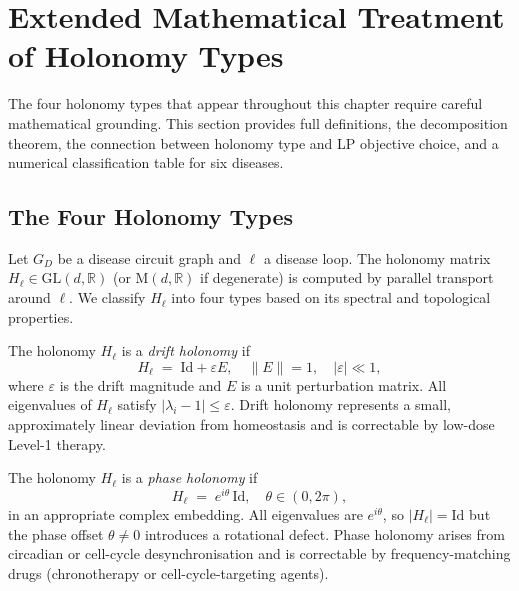 \section{Extended Mathematical Treatment of Holonomy Types}
\label{sec:ch10-holonomy-types}

The four holonomy types that appear throughout this chapter require careful
mathematical grounding.  This section provides full definitions, the
decomposition theorem, the connection between holonomy type and LP objective
choice, and a numerical classification table for six diseases.

\subsection{The Four Holonomy Types}

Let $G_D$ be a disease circuit graph and $\ell$ a disease loop.  The holonomy
matrix $H_\ell \in \mathrm{GL}(d, \mathbb{R})$ (or $\mathrm{M}(d,\mathbb{R})$
if degenerate) is computed by parallel transport around $\ell$.  We classify
$H_\ell$ into four types based on its spectral and topological properties.

\begin{definition}
\label{def:ch10-drift-holonomy}
The holonomy $H_\ell$ is a \emph{drift holonomy} if
\begin{equation}
  H_\ell \;=\; \mathrm{Id} + \varepsilon E,
  \quad \|E\| = 1,\quad |\varepsilon| \ll 1,
\end{equation}
where $\varepsilon$ is the drift magnitude and $E$ is a unit perturbation matrix.
All eigenvalues of $H_\ell$ satisfy $|\lambda_i - 1| \leq \varepsilon$.
Drift holonomy represents a small, approximately linear deviation from
homeostasis and is correctable by low-dose Level-1 therapy.
\end{definition}

\begin{definition}
\label{def:ch10-phase-holonomy}
The holonomy $H_\ell$ is a \emph{phase holonomy} if
\begin{equation}
  H_\ell \;=\; e^{i\theta}\, \mathrm{Id},
  \quad \theta \in (0, 2\pi),
\end{equation}
in an appropriate complex embedding.  All eigenvalues are $e^{i\theta}$, so
$|H_\ell| = \mathrm{Id}$ but the phase offset $\theta \neq 0$ introduces a
rotational defect.  Phase holonomy arises from circadian or cell-cycle
desynchronisation and is correctable by frequency-matching drugs (chronotherapy
or cell-cycle-targeting agents).
\end{definition}

